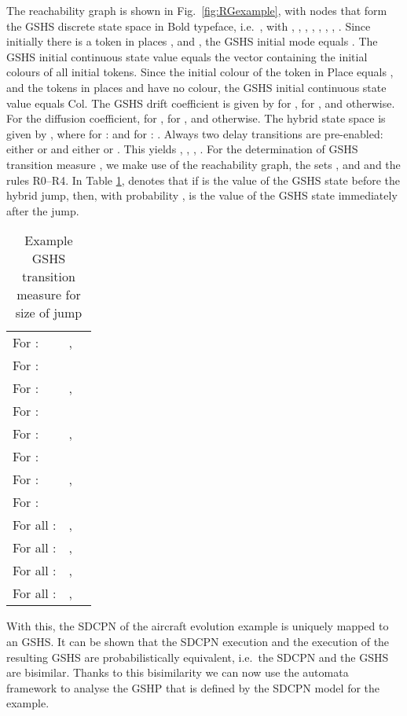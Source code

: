 \documentclass[copyright,creativecommons]{eptcs}
\begin{document}
The reachability graph is shown in Fig.\ \ref{fig:RGexample}, with
nodes that form the GSHS discrete state space in Bold typeface,
i.e.\ , with
, ,
, ,
, ,
,  . Since initially
there is a token in places ,  and , the GSHS
initial mode equals . The GSHS
initial continuous state value equals the vector containing the
initial colours of all initial tokens. Since the initial colour of
the token in Place  equals , and the tokens in places
 and  have no colour, the GSHS initial continuous state
value equals Col. The GSHS
drift coefficient  is given by  for ,  for , and
 otherwise. For the diffusion coefficient,
 for ,
 for ,
and  otherwise. The hybrid state space is given
by ,
where for :  and for :
. Always two delay transitions are
pre-enabled: either  or  and either  or . This
yields , , , . For the determination of GSHS transition measure , we make
use of the reachability graph, the sets ,  and
 and the rules R0--R4. In Table \ref{tab:Q},
 denotes that if  is the
value of the GSHS state before the hybrid jump, then, with
probability ,  is the value of the GSHS state
immediately after the jump.


\begin{table}[ht]
\centering \caption{Example GSHS transition measure for size of jump}
\label{tab:Q}
\begin{tabular}{|lll|}
\hline
For :  &
   ,    &
    \\
For :    &  &  \\
\hline For :    &
   ,   &
    \\
For :    &     &  \\
\hline For :    &
   ,    &
    \\
For :    &     &  \\
\hline For :    &
   ,   &
    \\
For :    &     &  \\
\hline For all :  & ,    &  \\ \hline For all :    &
,    &
 \\ \hline
For all :    & ,    &  \\ \hline For all :    &
,   &
 \\
\hline
\end{tabular}
\end{table}

With this, the SDCPN of the aircraft evolution example is uniquely
mapped to an GSHS. It can be shown that the SDCPN execution and the
execution of the resulting GSHS are probabilistically equivalent,
i.e.\ the SDCPN and the GSHS are bisimilar. Thanks to this bisimilarity
we can now use the automata framework to analyse the GSHP that is
defined by the SDCPN model for the example.
\end{document}
